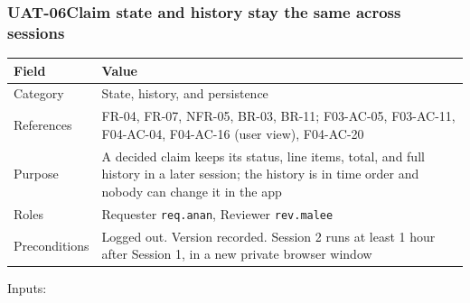 \subsubsection*{UAT-06\enspace Claim state and history stay the same across sessions}\label{case:UAT-06}

{\def\LTcaptype{none} %
\begin{longtable}[]{@{}
  >{\raggedright\arraybackslash}p{}
  >{\raggedright\arraybackslash}p{}@{}}
\toprule\noalign{}
\begin{minipage}[b]{\linewidth}\raggedright
Field
\end{minipage} & \begin{minipage}[b]{\linewidth}\raggedright
Value
\end{minipage} \\
\midrule\noalign{}
\endhead
\bottomrule\noalign{}
\endlastfoot
Category & State, history, and persistence \\
References & FR-04, FR-07, NFR-05, BR-03, BR-11; F03-AC-05, F03-AC-11, F04-AC-04, F04-AC-16 (user view), F04-AC-20 \\
Purpose & A decided claim keeps its status, line items, total, and full history in a later session; the history is in time order and nobody can change it in the app \\
Roles & Requester \texttt{req.anan}, Reviewer \texttt{rev.malee} \\
Preconditions & Logged out. Version recorded. Session 2 runs at least 1 hour after Session 1, in a new private browser window \\
\end{longtable}
}

Inputs:

